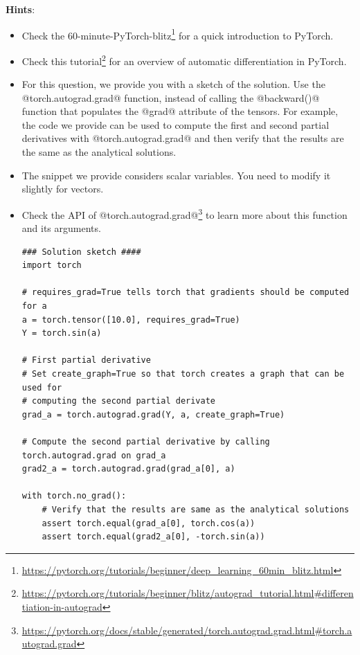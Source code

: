 \textbf{Hints}:
\begin{itemize}
\item Check the 60-minute-PyTorch-blitz\footnote{\url{https://pytorch.org/tutorials/beginner/deep_learning_60min_blitz.html}} for a quick introduction to PyTorch.  
\item Check this tutorial\footnote{\url{https://pytorch.org/tutorials/beginner/blitz/autograd_tutorial.html\#differentiation-in-autograd}} for an overview of automatic differentiation in PyTorch. 
\item For this question, we provide you with a sketch of the solution. Use the @torch.autograd.grad@ function, instead of calling the @backward()@ function that populates the @grad@ attribute of the tensors. For example, the code we provide can be used to compute the first and second partial derivatives with @torch.autograd.grad@ and then verify that the results are the same as the analytical solutions.
\item The snippet we provide considers scalar variables. You need to modify it slightly for vectors.
\item Check the API of @torch.autograd.grad@\footnote{\url{https://pytorch.org/docs/stable/generated/torch.autograd.grad.html\#torch.autograd.grad}} to learn more about this function and its arguments.
\begin{code}
    \begin{Verbatim}
### Solution sketch ####
import torch

# requires_grad=True tells torch that gradients should be computed for a
a = torch.tensor([10.0], requires_grad=True)  
Y = torch.sin(a)

# First partial derivative
# Set create_graph=True so that torch creates a graph that can be used for
# computing the second partial derivate
grad_a = torch.autograd.grad(Y, a, create_graph=True)

# Compute the second partial derivative by calling torch.autograd.grad on grad_a
grad2_a = torch.autograd.grad(grad_a[0], a)

with torch.no_grad():
    # Verify that the results are same as the analytical solutions
    assert torch.equal(grad_a[0], torch.cos(a))
    assert torch.equal(grad2_a[0], -torch.sin(a))

    \end{Verbatim}
\end{code}


\end{itemize}

